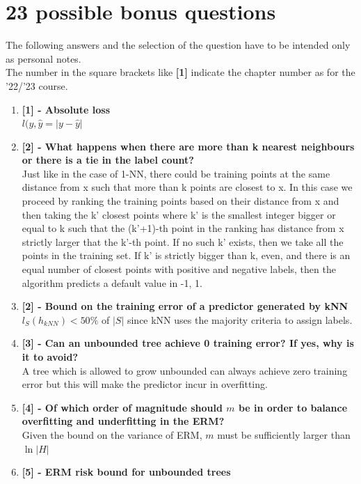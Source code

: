 \documentclass[a4paper]{report}
\begin{document}
\chapter*{23 possible bonus questions}
The following answers and the selection of the question have to be intended only as personal notes.\\
The number in the square brackets like \textbf{[1]} indicate the chapter number as for the '22/'23 course.\\
\begin{enumerate}
    \item \textbf{[1] - Absolute loss}\\
    $ l(y, \hat{y} = | y - \hat{y} |$
    \item \textbf{[2] - What happens when there are more than k nearest neighbours or there is a tie in the label count?}\\
    Just like in the case of 1-NN, there could be training points at the same distance from x such that more than k points are closest to x. In this case we proceed by ranking the training points based on their distance from x and then taking the k' closest points where k' is the smallest integer bigger or equal to k such that the (k'+1)-th point in the ranking has distance from x strictly larger that the k'-th point. If no such k' exists, then we take all the points in the training set. If k' is strictly bigger than k, even, and there is an equal number of closest points with positive and negative labels, then the algorithm predicts a default value in {-1, 1}.
    \item \textbf{[2] - Bound on the training error of a predictor generated by kNN}\\
    $l_{S}(h_{kNN}) < 50 \%$ of $|S|$ since kNN uses the majority criteria to assign labels.
    \item \textbf{[3] - Can an unbounded tree achieve 0 training error? If yes, why is it to avoid?}\\
    A tree which is allowed to grow unbounded can always achieve zero training error but this will make the predictor incur in overfitting.
    \item \textbf{[4] - Of which order of magnitude should $m$ be in order to balance overfitting and underfitting in the ERM?}\\
    Given the bound on the variance of ERM, $m$ must be sufficiently larger than $\ln{|H|}$
    \item \textbf{[5] - ERM risk bound for unbounded trees}\\

\end{enumerate}
\end{document}
